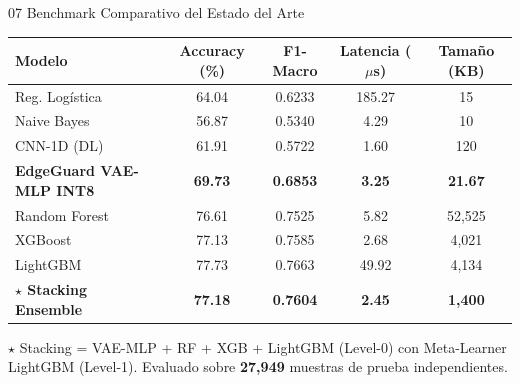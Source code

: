 \documentclass[aspectratio=169, 10pt]{beamer}
\begin{document}
\begin{frame}{07 \quad Benchmark Comparativo del Estado del Arte}
  \begin{center}
  \small
  \begin{tabular}{lcccc}
    \toprule
    \textbf{Modelo}  &  \textbf{Accuracy (\%)}  &  \textbf{F1-Macro}  &  \textbf{Latencia ($\mu$s)}  &  \textbf{Tamaño (KB)} \\
    \midrule
    Reg. Logística   &  64.04  &  0.6233  &  185.27  &  15 \\
    Naive Bayes      &  56.87  &  0.5340  &  4.29    &  10 \\
    CNN-1D (DL)      &  61.91  &  0.5722  &  1.60    &  120 \\
    \midrule
    \rowcolor{cyanneon!15}
    \textbf{EdgeGuard VAE-MLP INT8} & \textbf{69.73} & \textbf{0.6853} & \textbf{3.25} & \textbf{21.67} \\
    \midrule
    Random Forest    &  76.61  &  0.7525  &  5.82    &  52{,}525 \\
    XGBoost          &  77.13  &  0.7585  &  2.68    &  4{,}021 \\
    LightGBM         &  77.73  &  0.7663  &  49.92   &  4{,}134 \\
    \midrule
    \rowcolor{goldacc!20}
    \textbf{$\star$ Stacking Ensemble} & \textbf{77.18} & \textbf{0.7604} & \textbf{2.45} & \textbf{1{,}400} \\
    \bottomrule
  \end{tabular}
  \end{center}

  \vspace{0.15cm}
  \textcolor{textmuted}{\footnotesize $\star$ Stacking = VAE-MLP + RF + XGB + LightGBM (Level-0) con Meta-Learner LightGBM (Level-1). Evaluado sobre \textbf{27{,}949} muestras de prueba independientes.}
\end{frame}
\end{document}
